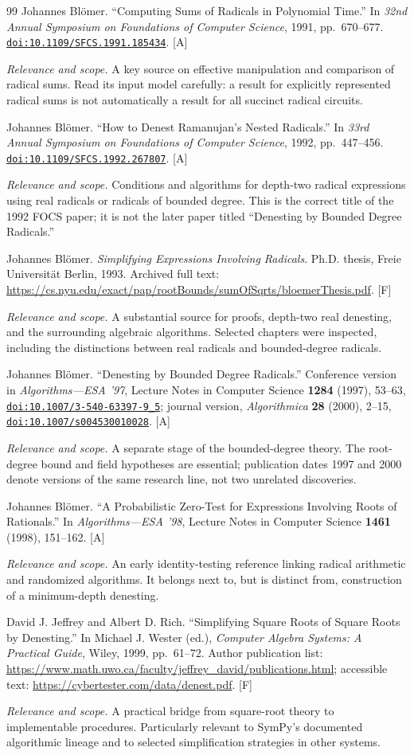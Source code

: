 \documentclass[11pt,oneside]{article}
\numberwithin{equation}{section}
\theoremstyle{definition}
\theoremstyle{remark}
\newcommand{\doi}[1]{\href{https://doi.org/#1}{\nolinkurl{doi:#1}}}
\newcommand{\status}[1]{\textsf{\small[#1]}}
\newcommand{\entrynote}[1]{\par\smallskip\noindent\emph{Relevance and scope.} #1}
\begin{document}
\begin{thebibliography}{99}
Johannes Bl\"omer. ``Computing Sums of Radicals in Polynomial Time.'' In \emph{32nd Annual Symposium on Foundations of Computer Science}, 1991, pp.~670--677. \doi{10.1109/SFCS.1991.185434}. \status{A}
\entrynote{A key source on effective manipulation and comparison of radical sums. Read its input model carefully: a result for explicitly represented radical sums is not automatically a result for all succinct radical circuits.}

Johannes Bl\"omer. ``How to Denest Ramanujan's Nested Radicals.'' In \emph{33rd Annual Symposium on Foundations of Computer Science}, 1992, pp.~447--456. \doi{10.1109/SFCS.1992.267807}. \status{A}
\entrynote{Conditions and algorithms for depth-two radical expressions using real radicals or radicals of bounded degree. This is the correct title of the 1992 FOCS paper; it is not the later paper titled ``Denesting by Bounded Degree Radicals.''}

Johannes Bl\"omer. \emph{Simplifying Expressions Involving Radicals}. Ph.D. thesis, Freie Universit\"at Berlin, 1993. Archived full text: \url{https://cs.nyu.edu/exact/pap/rootBounds/sumOfSqrts/bloemerThesis.pdf}. \status{F}
\entrynote{A substantial source for proofs, depth-two real denesting, and the surrounding algebraic algorithms. Selected chapters were inspected, including the distinctions between real radicals and bounded-degree radicals.}

Johannes Bl\"omer. ``Denesting by Bounded Degree Radicals.'' Conference version in \emph{Algorithms---ESA '97}, Lecture Notes in Computer Science \textbf{1284} (1997), 53--63, \doi{10.1007/3-540-63397-9_5}; journal version, \emph{Algorithmica} \textbf{28} (2000), 2--15, \doi{10.1007/s004530010028}. \status{A}
\entrynote{A separate stage of the bounded-degree theory. The root-degree bound and field hypotheses are essential; publication dates 1997 and 2000 denote versions of the same research line, not two unrelated discoveries.}

Johannes Bl\"omer. ``A Probabilistic Zero-Test for Expressions Involving Roots of Rationals.'' In \emph{Algorithms---ESA '98}, Lecture Notes in Computer Science \textbf{1461} (1998), 151--162. \status{A}
\entrynote{An early identity-testing reference linking radical arithmetic and randomized algorithms. It belongs next to, but is distinct from, construction of a minimum-depth denesting.}

David J. Jeffrey and Albert D. Rich. ``Simplifying Square Roots of Square Roots by Denesting.'' In Michael J. Wester (ed.), \emph{Computer Algebra Systems: A Practical Guide}, Wiley, 1999, pp.~61--72. Author publication list: \url{https://www.math.uwo.ca/faculty/jeffrey_david/publications.html}; accessible text: \url{https://cybertester.com/data/denest.pdf}. \status{F}
\entrynote{A practical bridge from square-root theory to implementable procedures. Particularly relevant to SymPy's documented algorithmic lineage and to selected simplification strategies in other systems.}


\end{thebibliography}
\end{document}
